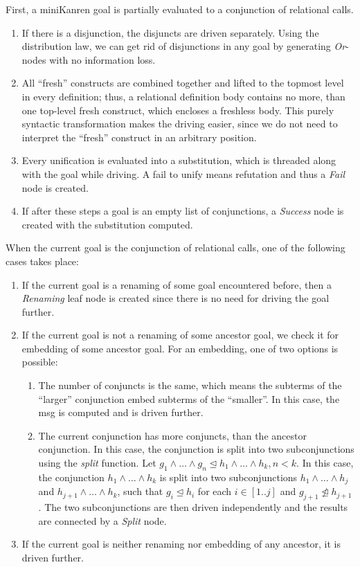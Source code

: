 \documentclass{llncs}
\begin{document}
First, a miniKanren goal is partially evaluated to a conjunction of relational calls.

\begin{enumerate}
  \item If there is a disjunction, the disjuncts are driven separately. Using the distribution law, we can get rid of disjunctions in any goal by generating \emph{Or}-nodes with no information loss. 
  \item All ``fresh'' constructs are combined together and lifted to the topmost level in every definition; thus, a relational definition body contains no more, than one top-level fresh construct, which encloses a freshless body. This purely syntactic transformation makes the driving easier, since we do not need to interpret the ``fresh'' construct in an arbitrary position. 
  \item Every unification is evaluated into a substitution, which is threaded along with the goal while driving. A fail to unify means refutation and thus a \emph{Fail} node is created. 
  \item If after these steps a goal is an empty list of conjunctions, a \emph{Success} node is created with the substitution computed. 
\end{enumerate}

When the current goal is the conjunction of relational calls, one of the following cases takes place:

\begin{enumerate}
  \item If the current goal is a renaming of some goal encountered before, then a \emph{Renaming} leaf node is created since there is no need for driving the goal further. 
  \item If the current goal is not a renaming of some ancestor goal, we check it for embedding of some ancestor goal. For an embedding, one of two options is possible:
  \begin{enumerate}
    \item The number of conjuncts is the same, which means the subterms of the ``larger'' conjunction embed subterms of the ``smaller''. In this case, the msg is computed and is driven further. 
    \item The current conjunction has more conjuncts, than the ancestor conjunction. In this case, the conjunction is split into two subconjunctions using the \emph{split} function. Let $g_1 \wedge \dots \wedge g_n \trianglelefteq h_1 \wedge \dots \wedge h_k, n < k$. In this case, the conjunction $h_1 \wedge \dots \wedge h_k$ is split into two subconjunctions $h_1 \wedge \dots \wedge h_j$ and $h_{j+1} \wedge \dots \wedge h_k$, such that $g_i \trianglelefteq h_i$ for each $i \in [1..j]$ and $g_{j+1} \ntrianglelefteq h_{j+1}$. The two subconjunctions are then driven independently and the results are connected by a \emph{Split} node. 
  \end{enumerate}     
  \item If the current goal is neither renaming nor embedding of any ancestor, it is driven further. 
\end{enumerate}
\end{document}
